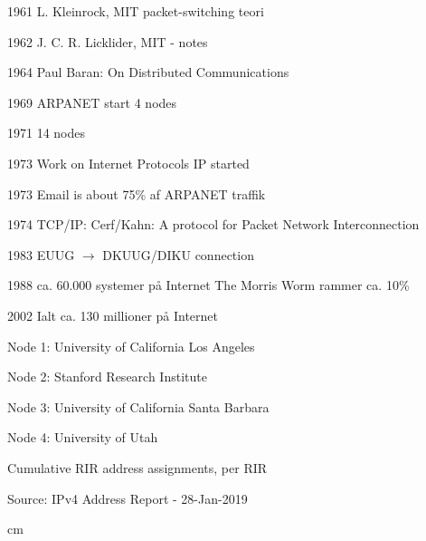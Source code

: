 \documentclass[Screen16to9,17pt]{foils}
\begin{document}

\begin{list2}
\item[1961]  L. Kleinrock, MIT packet-switching teori
\item[1962]  J. C. R. Licklider, MIT - notes
\item[1964]  Paul Baran: On Distributed Communications
\item[1969]  ARPANET start 4 nodes
\item[1971]  14 nodes
\item[1973]  Work on Internet Protocols IP started
\item[1973]  Email is about 75\% af ARPANET traffik
\item[1974]  TCP/IP: Cerf/Kahn: A protocol for Packet
        Network Interconnection
\item[1983]  EUUG $\rightarrow$ DKUUG/DIKU connection
\item[1988]  ca. 60.000 systemer på Internet
        The Morris Worm rammer ca. 10\%
\item[2002]  Ialt ca. 130 millioner på Internet
\end{list2}


\begin{list2}
\item Node 1: University of California Los Angeles
\item Node 2: Stanford Research Institute
\item Node 3: University of California Santa Barbara
\item Node 4: University of Utah
\end{list2}




\centerline{Cumulative RIR address assignments, per RIR}

\begin{list1}
\item Source:
IPv4 Address Report - 28-Jan-2019
\end{list1}


 cm
\end{document}

